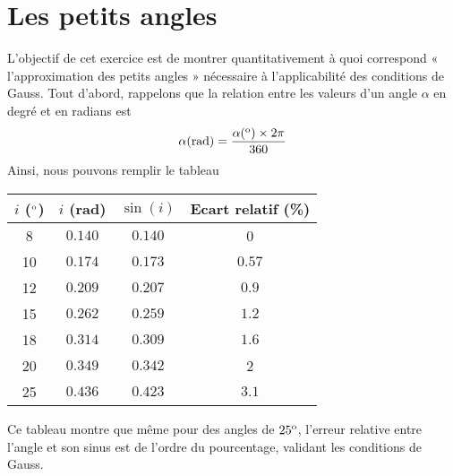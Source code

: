 \documentclass[../main/main.tex]{subfiles}
\begin{document}
\section{Les petits angles}

L'objectif de cet exercice est de montrer quantitativement à quoi correspond
« l'approximation des petits angles » nécessaire à l'applicabilité des conditions
de Gauss. Tout d'abord, rappelons que la relation entre les valeurs d'un angle
$\alpha$ en degré et en radians est
\begin{equation}
	\alpha({\rm rad}) = \dfrac{\alpha(^{\rm o})\times 2\pi}{360}
\end{equation}
Ainsi, nous pouvons remplir le tableau
\begin{table*}[h!]
	\centering
	\begin{tabular}{|c|c|c|c|}
		\hline
		$i$ ($^{\rm o}$) & $i$ (rad) & $\sin(i)$ & Ecart relatif (\%) \\
		\hline
		8 & $0.140$ & $0.140$ & 0 \\
		\hline
		10 & $0.174$ & $0.173$ & $0.57$ \\
		\hline
		12 & $0.209$ & $0.207$ & $0.9$ \\
		\hline
		15 & $0.262$ & $0.259$ & $1.2$ \\
		\hline
		18 & $0.314$ & $0.309$ & $1.6$ \\
		\hline
		20 & $0.349$ & $0.342$ & 2 \\
		\hline
		25 & $0.436$ & $0.423$ & $3.1$ \\
		\hline
	\end{tabular}
\end{table*}
Ce tableau montre que même pour des angles de $25^{\rm o}$, l'erreur relative
entre l'angle et son sinus est de l'ordre du pourcentage, validant les
conditions de Gauss.

\theendnotes
\end{document}

